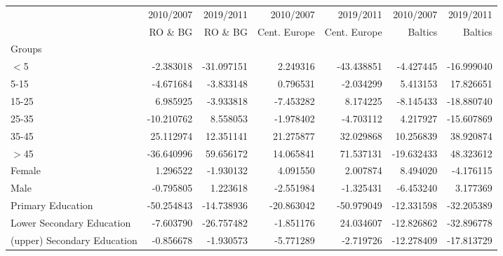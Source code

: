\documentclass[11pt]{article}
\begin{document}
\begin{table}[!htbp]
\begin{center}
{\begin{tabular}{lrrrrrr}
\toprule
{} &  2010/2007 &  2019/2011 &  2010/2007 &  2019/2011 &   2010/2007 &  2019/2011 \\
{} &     RO \& BG &     RO \& BG &   Cent. Europe &   Cent. Europe &      Baltics &     Baltics \\
Groups                                &            &            &            &            &             &            \\
\midrule
$<$5                                    &  -2.383018 & -31.097151 &   2.249316 & -43.438851 &   -4.427445 & -16.999040 \\
5-15                                  &  -4.671684 &  -3.833148 &   0.796531 &  -2.034299 &    5.413153 &  17.826651 \\
15-25                                 &   6.985925 &  -3.933818 &  -7.453282 &   8.174225 &   -8.145433 & -18.880740 \\
25-35                                 & -10.210762 &   8.558053 &  -1.978402 &  -4.703112 &    4.217927 & -15.607869 \\
35-45                                 &  25.112974 &  12.351141 &  21.275877 &  32.029868 &   10.256839 &  38.920874 \\
$>$45                                   & -36.640996 &  59.656172 &  14.065841 &  71.537131 &  -19.632433 &  48.323612 \\
Female                                &   1.296522 &  -1.930132 &   4.091550 &   2.007874 &    8.494020 &  -4.176115 \\
Male                                  &  -0.795805 &   1.223618 &  -2.551984 &  -1.325431 &   -6.453240 &   3.177369 \\
Primary Education                     & -50.254843 & -14.738936 & -20.863042 & -50.979049 &  -12.331598 & -32.205389 \\
Lower Secondary Education             &  -7.603790 & -26.757482 &  -1.851176 &  24.034607 &  -12.826862 & -32.896778 \\
(upper) Secondary Education           &  -0.856678 &  -1.930573 &  -5.771289 &  -2.719726 &  -12.278409 & -17.813729 \\

\end{tabular}}
\end{center}
\end{table}
\end{document}
